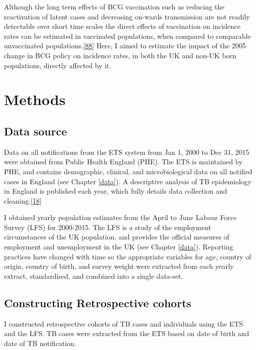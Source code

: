 \documentclass[11pt,twoside]{bristolthesis}
\begin{document}
  Although the long term effects of BCG vaccination such as reducing the reactivation of latent cases and decreasing on-wards transmission are not readily detectable over short time scales the direct effects of vaccination on incidence rates can be estimated in vaccinated populations, when compared to comparable unvaccinated populations.{[}\protect\hyperlink{ref-Parikh2016a}{88}{]} Here, I aimed to estimate the impact of the 2005 change in BCG policy on incidence rates, in both the UK and non-UK born populations, directly affected by it.
  
  \hypertarget{methods-1}{%
  \section{Methods}\label{methods-1}}
  
  \hypertarget{data-source}{%
  \subsection{Data source}\label{data-source}}
  
  Data on all notifications from the ETS system from Jan 1, 2000 to Dec 31, 2015 were obtained from Public Health England (PHE). The ETS is maintained by PHE, and contains demographic, clinical, and microbiological data on all notified cases in England (see Chapter \ref{data}). A descriptive analysis of TB epidemiology in England is published each year, which fully details data collection and cleaning.{[}\protect\hyperlink{ref-PHE2016a}{18}{]}
  
  I obtained yearly population estimates from the April to June Labour Force Survey (LFS) for 2000-2015. The LFS is a study of the employment circumstances of the UK population, and provides the official measures of employment and unemployment in the UK (see Chapter \ref{data}). Reporting practices have changed with time so the appropriate variables for age, country of origin, country of birth, and survey weight were extracted from each yearly extract, standardised, and combined into a single data-set.
  
  \hypertarget{constructing-retrospective-cohorts}{%
  \subsection{Constructing Retrospective cohorts}\label{constructing-retrospective-cohorts}}
  
  I constructed retrospective cohorts of TB cases and individuals using the ETS and the LFS. TB cases were extracted from the ETS based on date of birth and date of TB notification.
  
\end{document}
